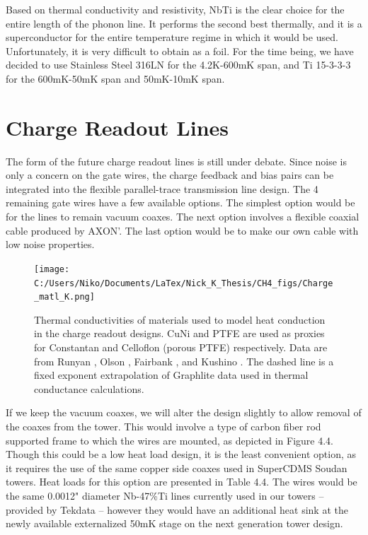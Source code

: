 \documentclass{report}
\begin{document}
Based on thermal conductivity and resistivity, NbTi is the clear choice for the entire length of the phonon line. It performs the second best thermally, and it is a superconductor for the entire temperature regime in which it would be used. Unfortunately, it is very difficult to obtain as a foil. For the time being, we have decided to use Stainless Steel 316LN for the 4.2K-600mK span, and Ti 15-3-3-3 for the 600mK-50mK span and 50mK-10mK span.

\section{Charge Readout Lines}

The form of the future charge readout lines is still under debate. Since noise is only a concern on the gate wires, the charge feedback and bias pairs can be integrated into the flexible parallel-trace transmission line design. The 4 remaining gate wires have a few available options. The simplest option would be for the lines to remain vacuum coaxes. The next option involves a flexible coaxial cable produced by AXON'. The last option would be to make our own cable with low noise properties.

\begin{figure}[ht]
\centering
\texttt{[image: C:/Users/Niko/Documents/LaTex/Nick\_K\_Thesis/CH4\_figs/Charge\_matl\_K.png]}
\caption{Thermal conductivities of materials used to model heat conduction in the charge readout designs. CuNi and PTFE are used as proxies for Constantan and Celloflon (porous PTFE) respectively. Data are from Runyan \cite{run}, Olson \cite{ols}, Fairbank \cite{fair}, and Kushino \cite{kus:cu}. The dashed line is a fixed exponent extrapolation of Graphlite data used in thermal conductance calculations.}
\end{figure}

If we keep the vacuum coaxes, we will alter the design slightly to allow removal of the coaxes from the tower. This would involve a type of carbon fiber rod supported frame to which the wires are mounted, as depicted in Figure 4.4. Though this could be a low heat load design, it is the least convenient option, as it requires the use of the same copper side coaxes used in SuperCDMS Soudan towers. Heat loads for this option are presented in Table 4.4. The wires would be the same 0.0012" diameter Nb-47\%Ti lines currently used in our towers -- provided by Tekdata -- however they would have an additional heat sink at the newly available externalized 50mK stage on the next generation tower design.
\end{document}
